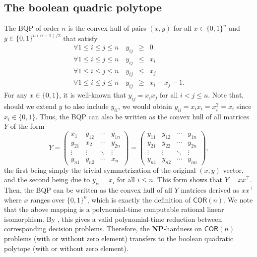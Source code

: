 \documentclass[envcountsect,envcountsame]{svjour3}
\theoremstyle{changebreak}                %
\newcommand{\transpose}[1]{{#1}^{\top}}
\newcommand{\COR}[1]{\mathsf{COR}(#1)}
\begin{document}
\subsection{The boolean quadric polytope}
\label{s:bqp}
The BQP of order $n$ is the convex hull of pairs $(x,y)$ for all $x\in\{0,1\}^n$ and $y\in\{0,1\}^{n(n-1)/2}$ that satisfy
\begin{eqnarray}
  \forall 1\le i\le j\le n\quad y_{ij} &\ge& 0 \\
  \forall 1\le i\le j\le n\quad y_{ij} &\le& x_i \\
  \forall 1\le i\le j\le n\quad y_{ij} &\le& x_j \\
  \forall 1\le i\le j\le n\quad y_{ij} &\ge& x_i + x_j - 1.
\end{eqnarray}
For any $x\in\{0,1\}$, it is well-known \cite{fortet} that $y_{ij}=x_ix_j$ for all $i<j\le n$. Note that, should we extend $y$ to also include $y_{ii}$, we would obtain $y_{ii}=x_ix_i=x_i^2=x_i$ since $x_i\in\{0,1\}$. Thus, the BQP can also be written as the convex hull of all matrices $Y$ of the form
\[
Y = \left(\begin{array}{cccc}
  x_1 & y_{12} & \cdots & y_{1n} \\
  y_{21} & x_2 & \cdots & y_{2n} \\
  \vdots & \vdots & \ddots & \vdots \\
  y_{n1} & y_{n2} & \cdots & x_n
  \end{array}\right) =
  \left(\begin{array}{cccc}
  y_{11} & y_{12} & \cdots & y_{1n} \\
  y_{21} & y_{22} & \cdots & y_{2n} \\
  \vdots & \vdots & \ddots & \vdots \\
  y_{n1} & y_{n2} & \cdots & y_{nn}
  \end{array}\right),
\]
the first being simply the trivial symmetrization of the original $(x,y)$ vector, and the second being due to $y_{ii}=x_i$ for all $i\le n$. This form shows that $Y=x\transpose{x}$. Then, the BQP can be written as the convex hull of all $Y$ matrices derived as $x\transpose{x}$ where $x$ ranges over $\{0,1\}^n$, which is exactly the definition of $\COR{n}$. We note that the above mapping is a polynomial-time computable rational linear isomorphism. By \cite{gls}, this gives a valid polynomial-time reduction between corresponding decision problems. Therefore, the \textbf{NP}-hardness on $\COR{n}$ problems (with or without zero element) transfers to the boolean quadratic polytope (with or without zero element).
\end{document}
